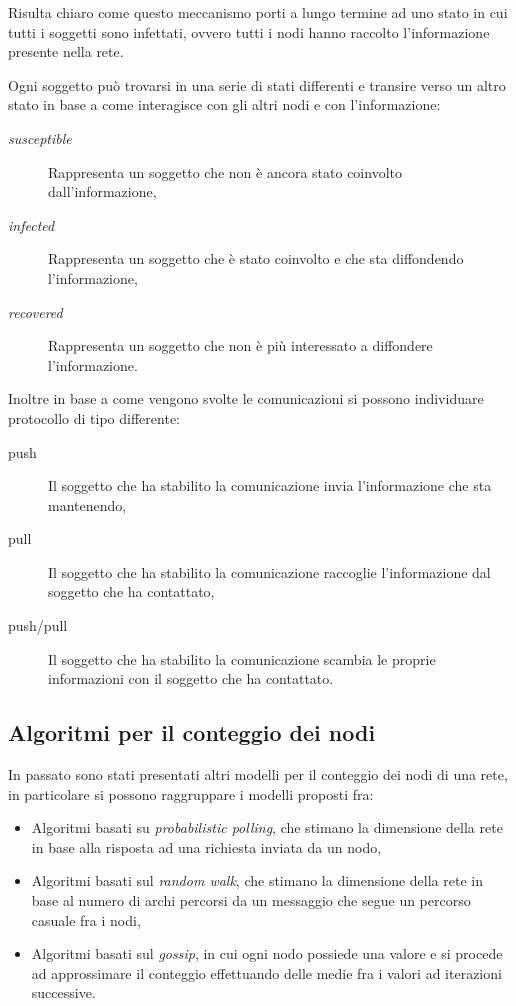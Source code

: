 \documentclass[a4paper,12pt]{article}
\begin{document}
Risulta chiaro come questo meccanismo porti a lungo termine ad uno stato in cui tutti i soggetti sono infettati, ovvero tutti i nodi hanno raccolto l'informazione presente nella rete.

Ogni soggetto pu\`o trovarsi in una serie di stati differenti e transire verso un altro stato in base a come interagisce con gli altri nodi e con l'informazione:
\begin{description}
\item[\emph{susceptible}] Rappresenta un soggetto che non \`e ancora stato  coinvolto dall'informazione,
\item[\emph{infected}] Rappresenta un soggetto che \`e stato coinvolto e che sta diffondendo l'informazione,
\item[\emph{recovered}] Rappresenta un soggetto che non \`e pi\`u interessato a diffondere l'informazione.
\end{description}

Inoltre in base a come vengono svolte le comunicazioni si possono individuare protocollo di tipo differente:
\begin{description}
\item[push] Il soggetto che ha stabilito la comunicazione invia l'informazione che sta mantenendo,
\item[pull] Il soggetto che ha stabilito la comunicazione raccoglie l'informazione dal soggetto che ha contattato,
\item[push/pull] Il soggetto che ha stabilito la comunicazione scambia le proprie informazioni con il soggetto che ha contattato.
\end{description}

\subsection{Algoritmi per il conteggio dei nodi}

In passato sono stati presentati altri modelli per il conteggio dei nodi di una rete, in particolare si possono raggruppare i modelli proposti fra:
\begin{itemize}
\item Algoritmi basati su \emph{probabilistic polling}, che stimano la dimensione della rete in base alla risposta ad una richiesta inviata da un nodo,
\item Algoritmi basati sul \emph{random walk}, che stimano la dimensione della rete in base al numero di archi percorsi da un messaggio che segue un percorso casuale fra i nodi,
\item Algoritmi basati sul \emph{gossip}, in cui ogni nodo possiede una valore e si procede ad approssimare il conteggio effettuando delle medie fra i valori ad iterazioni successive.
\end{itemize}
\end{document}
